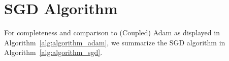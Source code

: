 \section{SGD Algorithm}
\label{app:sgd_algorithm}

For completeness and comparison to (Coupled) Adam as displayed in Algorithm~\ref{alg:algorithm_adam}, we summarize the SGD algorithm in Algorithm~\ref{alg:algorithm_sgd}.


